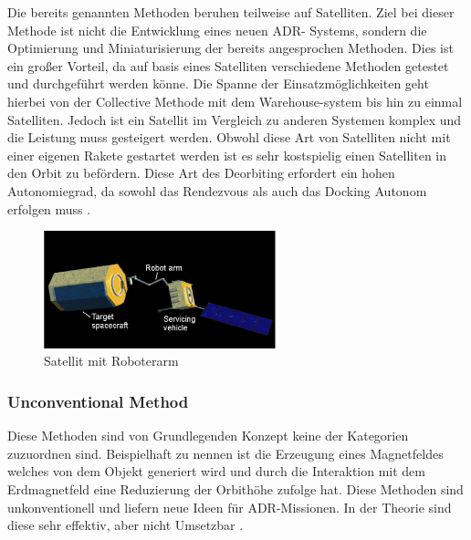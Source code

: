 	Die bereits genannten Methoden beruhen teilweise auf Satelliten. Ziel bei dieser Methode ist nicht die Entwicklung eines neuen ADR- Systems, sondern die Optimierung und Miniaturisierung der bereits angesprochen Methoden. Dies ist ein großer Vorteil, da auf basis eines Satelliten verschiedene Methoden getestet und durchgeführt werden könne. Die Spanne der Einsatzmöglichkeiten geht hierbei von der Collective Methode mit dem Warehouse-system bis hin zu einmal Satelliten. Jedoch ist ein Satellit im Vergleich zu anderen Systemen komplex und die Leistung muss gesteigert werden. Obwohl diese Art von Satelliten nicht mit einer eigenen Rakete gestartet werden ist es sehr kostspielig einen Satelliten in den Orbit zu befördern. Diese Art des Deorbiting erfordert ein hohen Autonomiegrad, da sowohl das Rendezvous als auch das Docking Autonom erfolgen muss \cite{Mark.2019}.

	\begin{figure}[h]
			\centering
					\includegraphics[width=0.60\textwidth]{./graphics/ADR/Sattelit_Methode.PNG}
				\caption{Satellit mit Roboterarm \cite{Nishida.2011}}
				\label{fig:Satellit}
			\end{figure}
			
	
\subsubsection{Unconventional	Method}
	
	Diese Methoden sind von Grundlegenden Konzept keine der Kategorien zuzuordnen sind. Beispielhaft zu nennen ist die Erzeugung eines Magnetfeldes welches von dem Objekt generiert wird und durch die Interaktion mit dem Erdmagnetfeld eine Reduzierung der Orbithöhe zufolge hat. Diese Methoden sind unkonventionell und liefern neue Ideen für ADR-Missionen. In der Theorie sind diese sehr effektiv, aber nicht Umsetzbar \cite{Mark.2019}.
					
